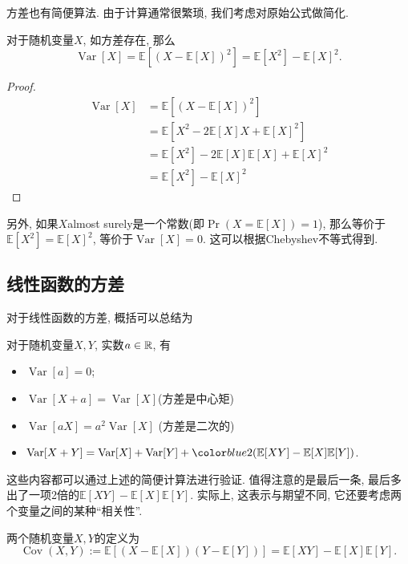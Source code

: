\documentclass{ctexart}
\begin{document}
方差也有简便算法. 由于计算通常很繁琐, 我们考虑对原始公式做简化. 

\begin{theorem}[方差的简便算法]
    对于随机变量$X$, 如方差存在, 那么$$\operatorname{Var}[X]=\mathbb{E}\left[(X-\mathbb{E}[X])^2\right]=\mathbb{E}\left[X^2\right]-\mathbb{E}[X]^2.$$
\end{theorem}

\begin{proof}
    $$\begin{aligned} \operatorname{Var}[X] & =\mathbb{E}\left[(X-\mathbb{E}[X])^2\right] \\ & =\mathbb{E}\left[X^2-2 \mathbb{E}[X] X+\mathbb{E}[X]^2\right] \\ & =\mathbb{E}\left[X^2\right]-2 \mathbb{E}[X] \mathbb{E}[X]+\mathbb{E}[X]^2 \\ & =\mathbb{E}\left[X^2\right]-\mathbb{E}[X]^2\end{aligned}$$
\end{proof}

另外, 如果$X$almost surely是一个常数(即$\operatorname{Pr}(X=\mathbb{E}[X])=1$), 那么等价于$\mathbb{E}\left[X^2\right]=\mathbb{E}[X]^2$, 等价于$\operatorname{Var}[X]=0$. 这可以根据Chebyshev不等式得到.  

\subsection{线性函数的方差} 对于线性函数的方差, 概括可以总结为
\begin{theorem}[方差的性质]
    对于随机变量$X, Y$, 实数$a \in \mathbb R$, 有
    \begin{itemize}
        \item $\operatorname{Var}[a]=0$;
        \item $\operatorname{Var}[X+a]=\operatorname{Var}[X]$(方差是中心矩)
        \item $\operatorname{Var}[a X]=a^2 \operatorname{Var}[X]$ (方差是二次的)
        \item $\operatorname{Var}[X+Y]=\operatorname{Var}[X]+\operatorname{Var}[Y]+\blue{2(\mathbb{E}[X Y]-\mathbb{E}[X] \mathbb{E}[Y])}$.
    \end{itemize}
\end{theorem}

这些内容都可以通过上述的简便计算法进行验证. 值得注意的是最后一条, 最后多出了一项2倍的$\mathbb{E}[X Y]-\mathbb{E}[X] \mathbb{E}[Y]$. 实际上, 这表示与期望不同, 它还要考虑两个变量之间的某种``相关性''.

\begin{definition}[协方差]
    两个随机变量$X, Y$的定义为
    $$\operatorname{Cov}(X, Y):=\mathbb{E}[(X-\mathbb{E}[X])(Y-\mathbb{E}[Y])]=\mathbb{E}[X Y]-\mathbb{E}[X] \mathbb{E}[Y].$$
\end{definition}
\end{document}

